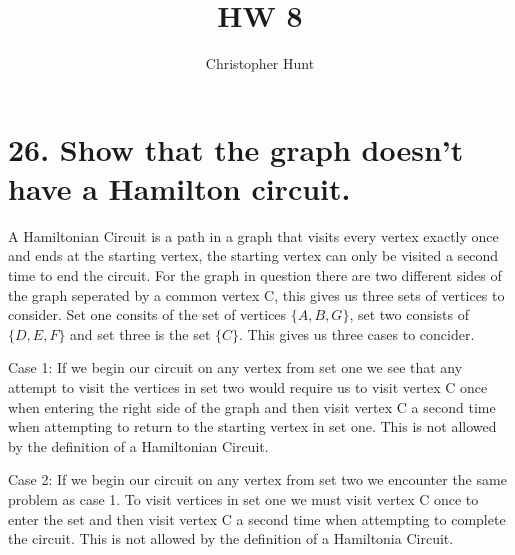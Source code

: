 \documentclass{article}
\title{HW 8}
\author{Christopher Hunt}
\date{}
\begin{document}
\pagestyle{fancy}
\fancyhf{}
\rhead{\thepage}
\maketitle

\section*{26. Show that the graph doesn't have a Hamilton circuit.}
\begin{center}
\end{center}

A Hamiltonian Circuit is a path in a graph that visits every vertex exactly once and ends at the starting vertex, the starting vertex can only be visited a second time to end the circuit. For the graph in question there are two different sides of the graph seperated by a common vertex C, this gives us three sets of vertices to consider. Set one consits of the set of vertices $\{A,B,G\}$, set two consists of $\{D,E,F\}$ and set three is the set $\{C\}$. This gives us three cases to concider.

Case 1: If we begin our circuit on any vertex from set one we see that any attempt to visit the vertices in set two would require us to visit vertex C once when entering the right side of the graph and then visit vertex C a second time when attempting to return to the starting vertex in set one. This is not allowed by the definition of a Hamiltonian Circuit.

Case 2: If we begin our circuit on any vertex from set two we encounter the same problem as case 1. To visit vertices in set one we must visit vertex C once to enter the set and then visit vertex C a second time when attempting to complete the circuit. This is not allowed by the definition of a Hamiltonia Circuit.
\end{document}
